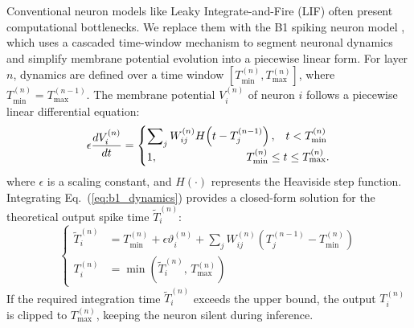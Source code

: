 \documentclass{nsr}
\begin{document}
Conventional neuron models like Leaky Integrate-and-Fire (LIF) \cite{ref30} often present computational bottlenecks. We replace them with the B1 spiking neuron model \cite{ref46}, which uses a cascaded time-window mechanism to segment neuronal dynamics and simplify membrane potential evolution into a piecewise linear form. For layer $n$, dynamics are defined over a time window $[T_{\min}^{(n)}, T_{\max}^{(n)}]$, where $T_{\min}^{(n)} = T_{\max}^{(n-1)}$. The membrane potential $V_i^{(n)}$ of neuron $i$ follows a piecewise linear differential equation:
\begin{equation}
\label{eq:b1_dynamics}
\epsilon \frac{dV_i^{(n)}}{dt} =
\begin{cases}
\displaystyle \sum\nolimits_j W_{ij}^{(n)} H\!\left(t-T_j^{(n-1)}\right), & t < T_{\min}^{(n)}\\[0.4em]
1, & \hspace{-3.5em}T_{\min}^{(n)} \le t \le T_{\max}^{(n)}.
\end{cases}
\end{equation}
where $\epsilon$ is a scaling constant, and $H(\cdot)$ represents the Heaviside step function. Integrating Eq.~(\ref{eq:b1_dynamics}) provides a closed-form solution for the theoretical output spike time $\tilde{T}_i^{(n)}$:
\begin{equation}
\label{eq:b1_combined}
\left\{
\begin{aligned}
\tilde{T}_i^{(n)} &= T_{\min}^{(n)} + \epsilon \vartheta_i^{(n)} + \sum\nolimits_j W_{ij}^{(n)}\!\left(T_j^{(n-1)} - T_{\min}^{(n)}\right) \\
T_i^{(n)} &= \min\!\left(\tilde{T}_i^{(n)},\, T_{\max}^{(n)}\right)
\end{aligned}
\right.
\end{equation}
\noindent If the required integration time $\tilde{T}_{i}^{(n)}$ exceeds the upper bound, the output $T_i^{(n)}$ is clipped to $T_{\max}^{(n)}$, keeping the neuron silent during inference.
\end{document}

